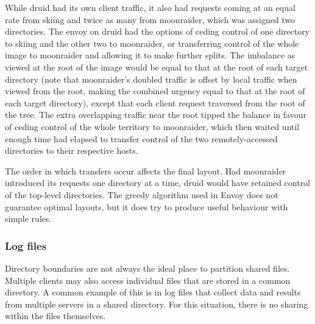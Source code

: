 While druid had its own client traffic, it also had requests coming at an equal rate from skiing and twice as many from moonraider, which was assigned two directories. The envoy on druid had the options of ceding control of one directory to skiing and the other two to moonraider, or transferring control of the whole image to moonraider and allowing it to make further splits. The imbalance as viewed at the root of the image would be equal to that at the root of each target directory (note that moonraider's doubled traffic is offset by local traffic when viewed from the root, making the combined urgency equal to that at the root of each target directory), except that each client request traversed from the root of the tree. The extra overlapping traffic near the root tipped the balance in favour of ceding control of the whole territory to moonraider, which then waited until enough time had elapsed to transfer control of the two remotely-accessed directories to their respective hosts.

The order in which transfers occur affects the final layout. Had moonraider introduced its requests one directory at a time, druid would have retained control of the top-level directories. The greedy algorithm used in Envoy does not guarantee optimal layouts, but it does try to produce useful behaviour with simple rules.

\subsubsection{Log files}

Directory boundaries are not always the ideal place to partition shared files. Multiple clients may also access individual files that are stored in a common directory. A common example of this is in log files that collect data and results from multiple servers in a shared directory. For this situation, there is no sharing within the files themselves.

